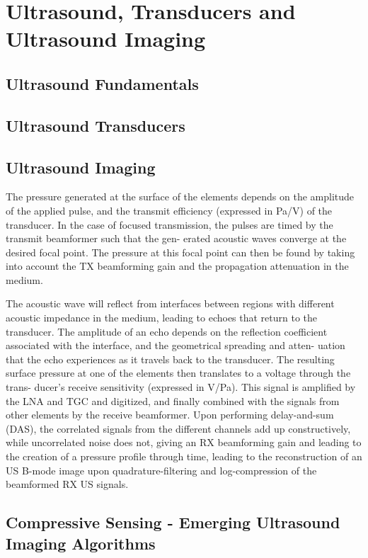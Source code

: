 
%

\chapter{Ultrasound, Transducers and Ultrasound Imaging}
\label{cha:users_manual}

\glsresetall




\section{Ultrasound Fundamentals}
\label{sec:ultrasound_fundamentals}

\section{Ultrasound Transducers}
\label{sec:ultrasound_transducers}

\section{Ultrasound Imaging}
\label{sec:ultrasound_imaging}

The pressure generated at the surface of the elements depends on the amplitude of the applied pulse, and the transmit efficiency (expressed in Pa/V) of the transducer. In the case of focused transmission, the pulses are timed by the transmit beamformer such that the gen- erated acoustic waves converge at the desired focal point. The pressure at this focal point can then be found by taking into account the TX beamforming gain and the propagation attenuation in the medium. 

The acoustic wave will reflect from interfaces between regions with different acoustic impedance in the medium, leading to echoes that return to the transducer. The amplitude of an echo depends on the reflection coefficient associated with the interface, and the geometrical spreading and atten- uation that the echo experiences as it travels back to the transducer. The resulting surface pressure at one of the elements then translates to a voltage through the trans- ducer’s receive sensitivity (expressed in V/Pa). This signal is amplified by the LNA and TGC and digitized, and finally combined with the signals from other elements by the receive beamformer. Upon performing delay-and-sum (DAS), the correlated signals from the different channels add up constructively, while uncorrelated noise does not, giving an RX beamforming gain and leading to the creation of a pressure profile through time, leading to the reconstruction of an US B-mode image upon quadrature-filtering and log-compression of the beamformed RX US signals.



\section{Compressive Sensing - Emerging Ultrasound Imaging Algorithms}
